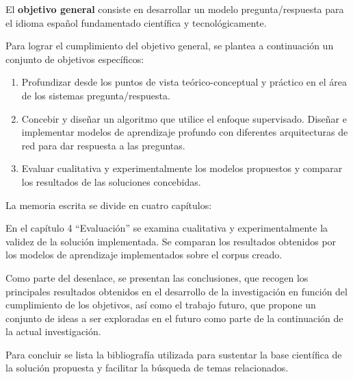 El \textbf{objetivo general} consiste en desarrollar un modelo pregunta/respuesta para el idioma español fundamentado científica y tecnológicamente.

Para lograr el cumplimiento del objetivo general, se plantea a continuación un conjunto de objetivos específicos:

\begin{enumerate}
    \item Profundizar desde los puntos de vista teórico-conceptual y práctico en el área de los sistemas pregunta/respuesta. 
    \item Concebir y diseñar un algoritmo que utilice el enfoque supervisado. Diseñar e implementar modelos de aprendizaje profundo con diferentes arquitecturas de red para dar respuesta a las preguntas.
    \item Evaluar cualitativa y experimentalmente los modelos propuestos y comparar los resultados de las soluciones concebidas.
\end{enumerate}

La memoria escrita se divide en cuatro capítulos:

En el capítulo 4 “Evaluación” se examina cualitativa y experimentalmente la validez de la solución implementada. Se comparan los resultados obtenidos por los modelos de aprendizaje implementados sobre el corpus creado.

Como parte del desenlace, se presentan las conclusiones, que recogen los principales resultados obtenidos en el desarrollo de la investigación en función del cumplimiento de los objetivos, así como el trabajo futuro, que propone un conjunto de ideas a ser exploradas en el futuro como parte de la continuación de la actual investigación.

Para concluir se lista la bibliografía utilizada para sustentar la base científica de la solución propuesta y facilitar la búsqueda de temas relacionados.

